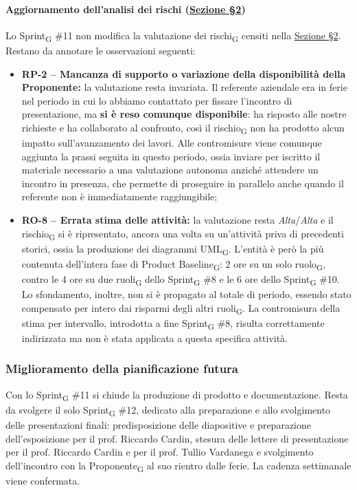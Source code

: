﻿\documentclass[a4paper, 10pt, colorlinks=true, linkcolor=black, urlcolor=blue, citecolor=blue, hidelinks]{article}
\begin{document}
\paragraph{Aggiornamento dell'analisi dei rischi (\hyperref[tab:gestione-rischi]{Sezione \S2})}
Lo Sprint\textsubscript{G} \#11 non modifica la valutazione dei rischi\textsubscript{G} censiti nella \hyperref[tab:gestione-rischi]{Sezione \S2}. Restano da annotare le osservazioni seguenti:
\begin{itemize}
    \item \textbf{RP-2 -- Mancanza di supporto o variazione della disponibilità della Proponente:} la valutazione resta invariata. Il referente aziendale era in ferie nel periodo in cui lo abbiamo contattato per fissare l'incontro di presentazione, ma \textbf{si è reso comunque disponibile}: ha risposto alle nostre richieste e ha collaborato al confronto, così il rischio\textsubscript{G} non ha prodotto alcun impatto sull'avanzamento dei lavori. Alle contromisure viene comunque aggiunta la prassi seguita in questo periodo, ossia inviare per iscritto il materiale necessario a una valutazione autonoma anziché attendere un incontro in presenza, che permette di proseguire in parallelo anche quando il referente non è immediatamente raggiungibile;

    \item \textbf{RO-8 -- Errata stima delle attività:} la valutazione resta \textit{Alta}/\textit{Alta} e il rischio\textsubscript{G} si è ripresentato, ancora una volta su un'attività priva di precedenti storici, ossia la produzione dei diagrammi UML\textsubscript{G}. L'entità è però la più contenuta dell'intera fase di Product Baseline\textsubscript{G}: 2 ore su un solo ruolo\textsubscript{G}, contro le 4 ore su due ruoli\textsubscript{G} dello Sprint\textsubscript{G} \#8 e le 6 ore dello Sprint\textsubscript{G} \#10. Lo sfondamento, inoltre, non si è propagato al totale di periodo, essendo stato compensato per intero dai risparmi degli altri ruoli\textsubscript{G}. La contromisura della stima per intervallo, introdotta a fine Sprint\textsubscript{G} \#8, risulta correttamente indirizzata ma non è stata applicata a questa specifica attività.
\end{itemize}

\subsubsection{Miglioramento della pianificazione futura}
Con lo Sprint\textsubscript{G} \#11 si chiude la produzione di prodotto e documentazione. Resta da svolgere il solo Sprint\textsubscript{G} \#12, dedicato alla preparazione e allo svolgimento delle presentazioni finali: predisposizione delle diapositive e preparazione dell'esposizione per il prof. Riccardo Cardin, stesura delle lettere di presentazione per il prof. Riccardo Cardin e per il prof. Tullio Vardanega e svolgimento dell'incontro con la Proponente\textsubscript{G} al suo rientro dalle ferie. La cadenza settimanale viene confermata.
\end{document}
